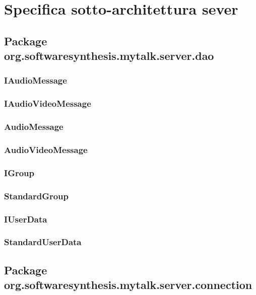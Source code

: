 \section{Specifica sotto-architettura sever}

\subsection{Package org.softwaresynthesis.mytalk.server.dao}

\subsubsection{IAudioMessage}

\subsubsection{IAudioVideoMessage}

\subsubsection{AudioMessage}

\subsubsection{AudioVideoMessage}

\subsubsection{IGroup}

\subsubsection{StandardGroup}

\subsubsection{IUserData}

\subsubsection{StandardUserData}

\subsection{Package org.softwaresynthesis.mytalk.server.connection}

